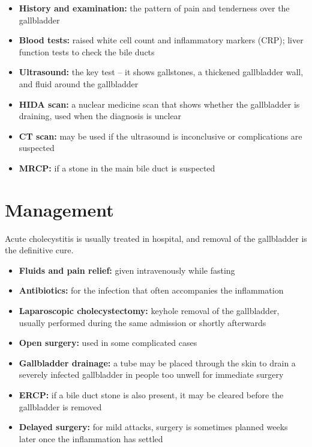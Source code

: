 \begin{itemize}
    \item \textbf{History and examination:} the pattern of pain and tenderness over the gallbladder
    \item \textbf{Blood tests:} raised white cell count and inflammatory markers (CRP); liver function tests to check the bile ducts
    \item \textbf{Ultrasound:} the key test -- it shows gallstones, a thickened gallbladder wall, and fluid around the gallbladder
    \item \textbf{HIDA scan:} a nuclear medicine scan that shows whether the gallbladder is draining, used when the diagnosis is unclear
    \item \textbf{CT scan:} may be used if the ultrasound is inconclusive or complications are suspected
    \item \textbf{MRCP:} if a stone in the main bile duct is suspected
\end{itemize}

\section*{Management}
Acute cholecystitis is usually treated in hospital, and removal of the gallbladder is the definitive cure.

\begin{itemize}
    \item \textbf{Fluids and pain relief:} given intravenously while fasting
    \item \textbf{Antibiotics:} for the infection that often accompanies the inflammation
    \item \textbf{Laparoscopic cholecystectomy:} keyhole removal of the gallbladder, usually performed during the same admission or shortly afterwards
    \item \textbf{Open surgery:} used in some complicated cases
    \item \textbf{Gallbladder drainage:} a tube may be placed through the skin to drain a severely infected gallbladder in people too unwell for immediate surgery
    \item \textbf{ERCP:} if a bile duct stone is also present, it may be cleared before the gallbladder is removed
    \item \textbf{Delayed surgery:} for mild attacks, surgery is sometimes planned weeks later once the inflammation has settled
\end{itemize}

